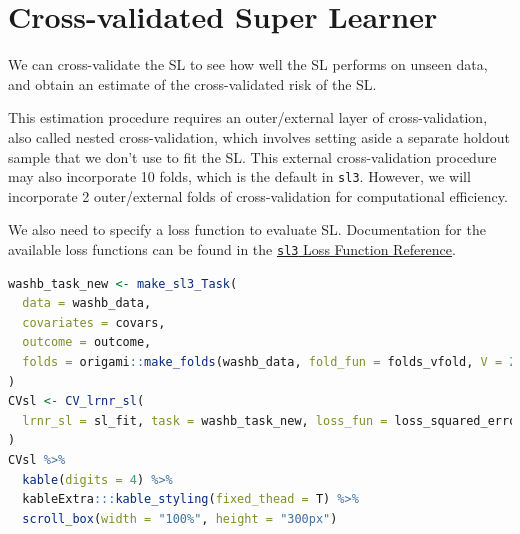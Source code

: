 \documentclass[
  12pt, krantz2,
]{krantz}
\newcommand{\passthrough}[1]{#1}
\newcommand{\1}{\mathbbm{1}}
\theoremstyle{definition}
\theoremstyle{definition}
\theoremstyle{definition}
\theoremstyle{definition}
\theoremstyle{remark}
\begin{document}
\hypertarget{cross-validated-super-learner}{%
\section*{Cross-validated Super Learner}\label{cross-validated-super-learner}}


We can cross-validate the SL to see how well the SL performs on unseen data, and
obtain an estimate of the cross-validated risk of the SL.

This estimation procedure requires an outer/external layer of
cross-validation, also called nested cross-validation, which involves setting
aside a separate holdout sample that we don't use to fit the SL. This external
cross-validation procedure may also incorporate 10 folds, which is the default
in \passthrough{\lstinline!sl3!}. However, we will incorporate 2 outer/external folds of
cross-validation for computational efficiency.

We also need to specify a loss function to evaluate SL. Documentation for the
available loss functions can be found in the \href{https://tlverse.org/sl3/reference/loss_functions.html}{\passthrough{\lstinline!sl3!} Loss Function
Reference}.

\begin{lstlisting}[language=R]
washb_task_new <- make_sl3_Task(
  data = washb_data,
  covariates = covars,
  outcome = outcome,
  folds = origami::make_folds(washb_data, fold_fun = folds_vfold, V = 2)
)
CVsl <- CV_lrnr_sl(
  lrnr_sl = sl_fit, task = washb_task_new, loss_fun = loss_squared_error
)
CVsl %>%
  kable(digits = 4) %>%
  kableExtra:::kable_styling(fixed_thead = T) %>%
  scroll_box(width = "100%", height = "300px")
\end{lstlisting}
\end{document}
